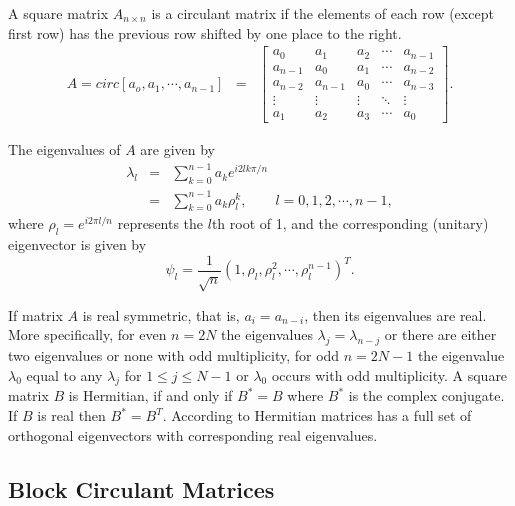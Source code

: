 A square matrix $A_{n\times n}$ is a circulant matrix if the elements of each row (except first row) has the previous row shifted by one place to the right.
\begin{eqnarray}
	A = circ[a_o, a_1,\cdots,a_{n-1}] &=& \left[
		\begin{array}{lllll}
			a_0     & a_1     & a_2    & \cdots & a_{n-1} \\
			a_{n-1} & a_0     & a_1    & \cdots & a_{n-2} \\
			a_{n-2} & a_{n-1} & a_0    & \cdots & a_{n-3} \\
			\vdots  & \vdots  & \vdots & \ddots & \vdots  \\
			a_1     & a_2     & a_3    & \cdots & a_0
		\end{array}
	\right].
\end{eqnarray}

The eigenvalues of $A$ are given by
\begin{eqnarray*}
	\lambda_l & = & \sum_{k=0}^{n-1} a_k e^{i2lk\pi/n} \\
	& = & \sum_{k=0}^{n-1}a_k \rho_l^k, \quad \quad l = 0, 1, 2, \cdots, n-1,
\end{eqnarray*}
where $\rho_l = e^{i2\pi l/n}$ represents the $l$th root of 1, and the corresponding (unitary) eigenvector is given by
\[
	\psi_l = \frac{1}{\sqrt{n}}(1, \rho_l, \rho_l^2, \cdots, \rho_l^{n-1})^T.
\]

If matrix $A$ is real symmetric, that is, $a_i = a_{n-i}$, then its eigenvalues are real. More specifically, for even $n=2N$ the eigenvalues $\lambda_j = \lambda_{n-j}$ or there are either two eigenvalues or none with odd multiplicity, for odd $n=2N-1$ the eigenvalue $\lambda_0$ equal to any $\lambda_j$ for $1\le j \le N-1$ or $\lambda_0$ occurs with odd multiplicity. A square matrix $B$ is Hermitian, if and only if $B^* = B$ where $B^*$ is the complex conjugate. If $B$ is real then $B^* = B^T$. According to \cite{Tee2005} Hermitian matrices has a full set of orthogonal eigenvectors with corresponding real eigenvalues.


\subsection{Block Circulant Matrices}


